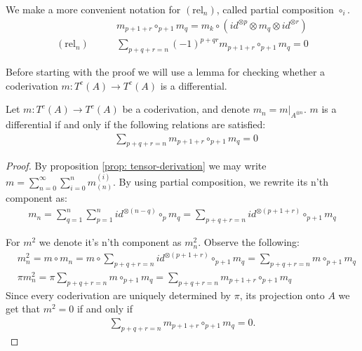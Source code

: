 \documentclass[../thesis.tex]{subfiles}
\begin{document}
        \begin{remark}
            We make a more convenient notation for $(\text{rel}_n)$, called partial composition $\circ_i$.
            \begin{align*}
                & m_{p+1+r} \circ_{p+1} m_q = m_k \circ (id^{\otimes p}\otimes m_q \otimes id^{\otimes r}) \\
                (\text{rel}_n)\qquad & \sum_{p+q+r = n} (-1)^{p+qr} m_{p+1+r} \circ_{p+1} m_q = 0
            \end{align*}
        \end{remark}

        Before starting with the proof we will use a lemma for checking whether a coderivation $m: T^c(A) \rightarrow T^c(A)$ is a differential.

        \begin{lemma}\label{lem: coderivation-is-diff?}
            Let $m: T^c(A) \rightarrow T^c(A)$ be a coderivation, and denote $m_n = m|_{A^{\otimes n}}$. $m$ is a differential if and only if the following relations are satisfied:
            \begin{align*}
                & \sum_{p+q+r = n}m_{p+1+r}\circ_{p+1}m_q = 0
            \end{align*}
        \end{lemma}

        \begin{proof}
            By proposition \ref{prop: tensor-derivation} we may write $m = \sum_{n = 0}^\infty \sum_{i = 0}^n m_{(n)}^{(i)}$. By using partial composition, we rewrite its n'th component as:
            \begin{align*}
                m_n = \sum_{q=1}^n\sum_{p = 1}^n id^{\otimes (n-q)}\circ_{p} m_q = \sum_{p + q + r = n}id^{\otimes (p+1+r)}\circ_{p+1}m_q
            \end{align*}

            For $m^2$ we denote it's n'th component as $m^2_n$. Observe the following:
            \begin{align*}
                & m^2_n = m\circ m_n = m\circ \sum_{p + q + r = n}id^{\otimes (p+1+r)}\circ_{p+1}m_q = \sum_{p + q + r = n}m\circ_{p+1}m_q \\
                & \pi m^2_n = \pi \sum_{p + q + r = n}m\circ_{p+1}m_q = \sum_{p + q + r = n}m_{p+1+r}\circ_{p+1}m_q
            \end{align*}
            Since every coderivation are uniquely determined by $\pi$, its projection onto $A$ we get that $m^2 = 0$ if and only if
            \begin{align*}
                \sum_{p+q+r = n}m_{p+1+r}\circ_{p+1}m_q = 0\text{.}
            \end{align*}
        \end{proof}
\end{document}
